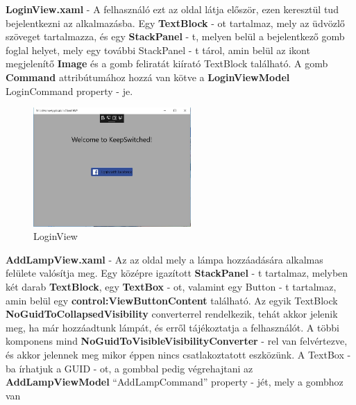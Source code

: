\documentclass[a4paper,12pt]{report}
\begin{document}
    \textbf{LoginView.xaml} - A felhasználó ezt az oldal látja először, ezen keresztül tud bejelentkezni az alkalmazásba. Egy \textbf{TextBlock} - ot
    tartalmaz, mely az üdvözlő szöveget tartalmazza, és egy \textbf{StackPanel} - t, melyen belül a bejelentkező gomb foglal helyet, mely egy további
    StackPanel - t tárol, amin belül az ikont megjelenítő \textbf{Image} és a gomb feliratát kiírató TextBlock található.  A gomb \textbf{Command}
    attribútumához hozzá van kötve a \textbf{LoginViewModel} LoginCommand property - je.

\begin{figure}[H]
    \centering
    \includegraphics[width=6cm,keepaspectratio]{images/loginview.jpg}
    \caption{LoginView}
    \label{fig: LoginView}
\end{figure}

    \textbf{AddLampView.xaml} - Az az oldal mely a lámpa hozzáadására alkalmas felülete valósítja meg. Egy középre igazított \textbf{StackPanel} - t
    tartalmaz, melyben két darab \textbf{TextBlock}, egy \textbf{TextBox} - ot, valamint egy Button - t tartalmaz, amin belül egy \textbf{control:ViewButtonContent}
    található. Az egyik TextBlock \textbf{NoGuidToCollapsedVisibility} converterrel rendelkezik, tehát akkor jelenik meg, ha már hozzáadtunk lámpát,
    és erről tájékoztatja a felhasználót. A többi komponens mind \textbf{NoGuidToVisibleVisibilityConverter} - rel van felvértezve, és akkor
    jelennek meg mikor éppen nincs csatlakoztatott eszközünk. A TextBox - ba írhatjuk a GUID - ot, a gombbal pedig végrehajtani az \textbf{AddLampViewModel}
    ``AddLampCommand'' property - jét, mely a gombhoz van
\end{document}
